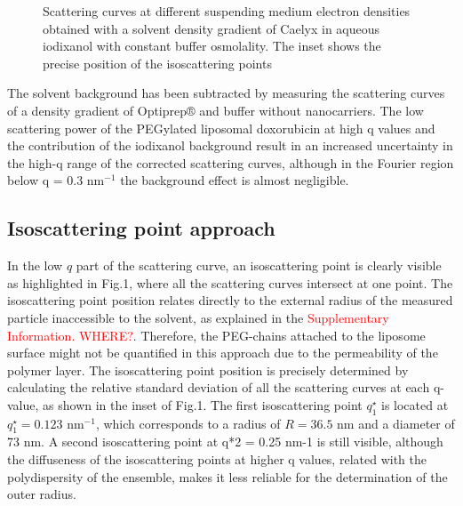 \begin{figure}
	\centering
		\caption{Scattering curves at different suspending medium electron densities obtained with a solvent density gradient of Caelyx in aqueous iodixanol with constant buffer osmolality. The inset shows the precise position of the isoscattering points}
\end{figure}

The solvent background has been subtracted by measuring the scattering curves of a density gradient of Optiprep® and buffer without nanocarriers. The low scattering power of the PEGylated liposomal doxorubicin at high q values and the contribution of the iodixanol background  result in an increased uncertainty in the high-q range of the corrected scattering curves, although in the Fourier region below q = 0.3 nm$^{-1}$ the background effect is almost negligible.

\subsection{Isoscattering point approach}
In the low $q$ part of the scattering curve, an isoscattering point is clearly visible as highlighted in Fig.1, where all the scattering curves intersect at one point. The isoscattering point position relates directly to the external radius of the measured particle inaccessible to the solvent, as explained in the \textcolor{red}{Supplementary Information.  WHERE?}. Therefore, the PEG-chains attached to the liposome surface might not be quantified in this approach due to the permeability of the polymer layer. The isoscattering point position is precisely determined by calculating the relative standard deviation of all the scattering curves at each q-value, as shown in the inset of Fig.1. The first isoscattering point $q^{\star}_1$ is located at $q^{\star}_1 = 0.123$ nm$^{-1}$, which corresponds to a radius of $R = 36.5$ nm and a diameter of 73 nm. A second isoscattering point at q*2 = 0.25 nm-1 is still visible, although the diffuseness of the isoscattering points at higher q values, related with the polydispersity of the ensemble, makes it less reliable for the determination of the outer radius.

